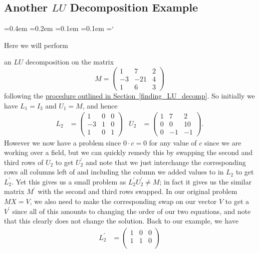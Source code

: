 
\subsection*{Another $LU$ Decomposition Example}

{\ttfamily
{}\font=0.4em
\font=0.2em
\font=0.1em
\font=0.1em
\hyphenchar\font=`\-


\hypertarget{scripts_lu_decomposition_example}{Here we will perform} an $LU$ decomposition on the matrix
\[
M = \begin{pmatrix}
1 & 7 & 2 \\
-3 & -21 & 4 \\
1 & 6 & 3
\end{pmatrix}
\]
following the \hyperref[finding_LU_decomp]{procedure outlined in Section~\ref*{finding_LU_decomp}}. So initially we have $L_1 = I_3$ and $U_1 = M$, and hence
\begin{align*}
L_2 & = \begin{pmatrix}
1 & 0 & 0 \\
-3 & 1 & 0 \\
1 & 0 & 1
\end{pmatrix}
& U_2 & = \begin{pmatrix}
1 & 7 & 2 \\
0 & 0 & 10 \\
0 & -1 & -1
\end{pmatrix}.
\end{align*}
However we now have a problem since $0 \cdot c = 0$ for any value of $c$ since we are working over a field, but we can quickly remedy this by swapping the second and third rows of $U_2$ to get $U_2^{\prime}$ and note that we just interchange the corresponding rows all columns left of and including the column we added values to in $L_2$ to get $L_2^{\prime}$. Yet this gives us a small problem as $L_2^{\prime} U_2^{\prime} \neq M$; in fact it gives us the similar matrix $M^{\prime}$ with the second and third rows swapped. In our original problem $MX = V$, we also need to make the corresponding swap on our vector $V$ to get a $V^{\prime}$ since all of this amounts to changing the order of our two equations, and note that this clearly does not change the solution. Back to our example, we have
\begin{align*}
L_2^{\prime} & = \begin{pmatrix}
1 & 0 & 0 \\
1 & 1 & 0 \\

\end{pmatrix}
\end{align*}}
